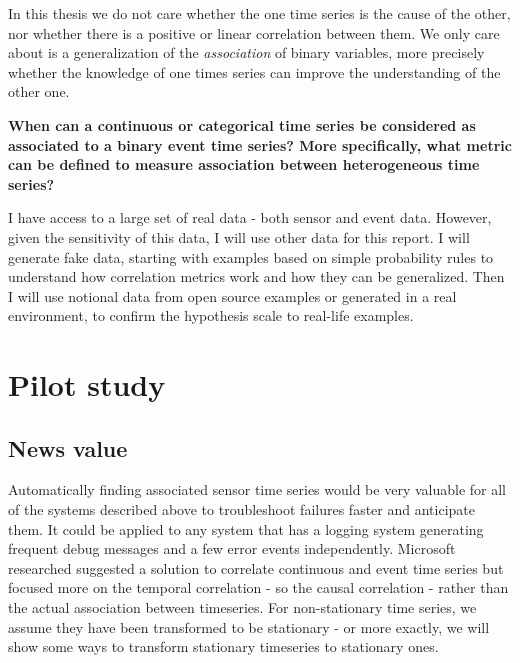 \documentclass[12pt,a4paper]{article}
\begin{document}
In this thesis we do not care whether the one time series is the cause of the other, nor whether there is a positive or linear correlation between them. We only care about is a generalization of the \emph{association} of binary variables, more precisely whether the knowledge of one times series can improve the understanding of the other one.

\medskip

\textbf{When can a continuous or categorical time series be considered as associated to a binary event time series? More specifically, what metric can be defined to measure association between heterogeneous time series?}

\medskip

I have access to a large set of real data - both sensor and event data. However, given the sensitivity of this data, I will use other data for this report.
I will generate fake data, starting with examples based on simple probability rules to understand how correlation metrics work and how they can be generalized. Then I will use notional data from open source examples or generated in a real environment, to confirm the hypothesis scale to real-life examples.

\clearpage

\section{Pilot study}

\subsection{News value}

Automatically finding associated sensor time series would be very valuable for all of the systems described above to troubleshoot failures faster and anticipate them. 
It could be applied to any system that has a logging system generating frequent debug messages and a few error events independently.
Microsoft researched suggested a solution to correlate continuous and event time series \cite{incident-diagnosis} but focused more on the temporal correlation - so the causal correlation - rather than the actual association between timeseries. For non-stationary time series, we assume they have been transformed to be stationary - or more exactly, we will show some ways to transform stationary timeseries to stationary ones.

\end{document}
